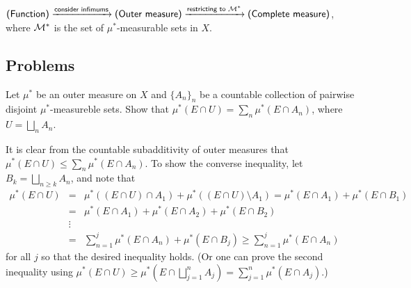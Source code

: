 \begin{rmk}
    $\textsf{(Function)}\xrightarrow{\textsf{consider infimums}}\textsf{(Outer measure)}\xrightarrow{\textsf{restricting to ${\mathcal{M}}^*$}}\textsf{(Complete measure)}$,
    where ${\mathcal{M}}^*$ is the set of $\mu^*$-measurable sets in $X$.
\end{rmk}

\subsection*{Problems}

\begin{prob}[Exercise 1.17]
    Let $\mu^*$ be an outer measure on $X$ and $\{A_n\}_n$ be a countable collection of pairwise disjoint $\mu^*$-measureble sets.
    Show that $\mu^*(E\cap U)=\sum_n\mu^*(E\cap A_n)$, where $U=\bigsqcup_n A_n$.
\end{prob}
\begin{sol}
    It is clear from the countable subadditivity of outer measures that $\mu^*(E\cap U)\leq\sum_n\mu^*(E\cap A_n)$.
    To show the converse inequality, let $B_k=\bigsqcup_{n\geq k} A_n$, and note that
    \begin{eqnarray*}
        \mu^*(E\cap U)
        &=&\mu^*((E\cap U)\cap A_1)+\mu^*((E\cap U)\setminus A_1)=\mu^*(E\cap A_1)+\mu^*(E\cap B_1)\\
        &=&\mu^*(E\cap A_1)+\mu^*(E\cap A_2)+\mu^*(E\cap B_2)\\
        &\vdots&\\
        &=&\sum_{n=1}^j\mu^*(E\cap A_n)+\mu^*(E\cap B_j)\geq\sum_{n=1}^j\mu^*(E\cap A_n)
    \end{eqnarray*}
    for all $j$ so that the desired inequality holds.
    (Or one can prove the second inequality using $\mu^*(E\cap U)\geq\mu^*(E\cap \bigsqcup_{j=1}^n A_j)=\sum_{j=1}^n\mu^*(E\cap A_j)$.)
\end{sol}
